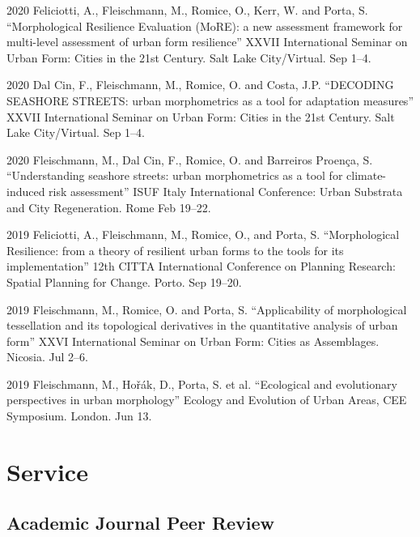 \documentclass[12pt,a4paper]{report}
\begin{document}
\begin{tablist}
        \item[2020] \tab{}Feliciotti, A., Fleischmann, M., Romice, O., Kerr, W. and Porta, S. \enquote{Morphological Resilience Evaluation (MoRE): a new assessment framework for multi-level assessment of urban form resilience} XXVII International Seminar on Urban Form: Cities in the 21st Century. Salt Lake City/Virtual. \@ Sep 1--4.

        \item[2020] \tab{}Dal Cin, F., Fleischmann, M., Romice, O. and Costa, J.P. \enquote{DECODING SEASHORE STREETS: urban morphometrics as a tool for adaptation measures} XXVII International Seminar on Urban Form: Cities in the 21st Century. Salt Lake City/Virtual. \@ Sep 1--4.

        \item[2020] \tab{}Fleischmann, M., Dal Cin, F., Romice, O. and Barreiros Proença, S. \enquote{Understanding seashore streets: urban morphometrics as a tool for climate-induced risk assessment} ISUF Italy International Conference: Urban Substrata and City Regeneration. Rome \@ Feb 19--22.

        \item[2019] \tab{}Feliciotti, A., Fleischmann, M., Romice, O., and Porta, S.  \enquote{Morphological Resilience: from a theory of resilient urban forms to the tools for its implementation} 12th CITTA International Conference on Planning Research: Spatial Planning for Change. Porto. \@ Sep 19--20.

        \item[2019] \tab{}Fleischmann, M., Romice, O. and Porta, S. \enquote{Applicability of morphological tessellation and its topological derivatives in the quantitative analysis of urban form} XXVI International Seminar on Urban Form: Cities as Assemblages. Nicosia. \@ Jul 2--6.

        \item[2019] \tab{}Fleischmann, M., Hořák, D., Porta, S. et al. \enquote{Ecological and evolutionary perspectives in urban morphology} Ecology and Evolution of Urban Areas, CEE Symposium. London. \@ Jun 13.


    \end{tablist}


    \section*{Service}

    \subsection*{Academic Journal Peer Review}
\end{document}
